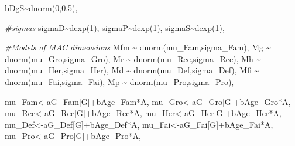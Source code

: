 \documentclass[
]{book}
\newenvironment{Shaded}{\begin{snugshade}}{\end{snugshade}}
\newcommand{\CommentTok}[1]{\textcolor[rgb]{0.56,0.35,0.01}{\textit{#1}}}
\newcommand{\DecValTok}[1]{\textcolor[rgb]{0.00,0.00,0.81}{#1}}
\newcommand{\FloatTok}[1]{\textcolor[rgb]{0.00,0.00,0.81}{#1}}
\newcommand{\FunctionTok}[1]{\textcolor[rgb]{0.00,0.00,0.00}{#1}}
\newcommand{\NormalTok}[1]{#1}
\newcommand{\OtherTok}[1]{\textcolor[rgb]{0.56,0.35,0.01}{#1}}
\newcommand{\SpecialCharTok}[1]{\textcolor[rgb]{0.00,0.00,0.00}{#1}}
\begin{document}
\begin{Shaded}
\begin{Highlighting}[]
\NormalTok{    bDgS}\SpecialCharTok{\textasciitilde{}}\FunctionTok{dnorm}\NormalTok{(}\DecValTok{0}\NormalTok{,}\FloatTok{0.5}\NormalTok{),}
    
    \CommentTok{\#sigmas}
\NormalTok{    sigmaD}\SpecialCharTok{\textasciitilde{}}\FunctionTok{dexp}\NormalTok{(}\DecValTok{1}\NormalTok{),}
\NormalTok{    sigmaP}\SpecialCharTok{\textasciitilde{}}\FunctionTok{dexp}\NormalTok{(}\DecValTok{1}\NormalTok{),}
\NormalTok{    sigmaS}\SpecialCharTok{\textasciitilde{}}\FunctionTok{dexp}\NormalTok{(}\DecValTok{1}\NormalTok{),}
    
    \CommentTok{\#Models of MAC dimensions}
\NormalTok{    Mfm }\SpecialCharTok{\textasciitilde{}} \FunctionTok{dnorm}\NormalTok{(mu\_Fam,sigma\_Fam),}
\NormalTok{    Mg }\SpecialCharTok{\textasciitilde{}} \FunctionTok{dnorm}\NormalTok{(mu\_Gro,sigma\_Gro),}
\NormalTok{    Mr }\SpecialCharTok{\textasciitilde{}} \FunctionTok{dnorm}\NormalTok{(mu\_Rec,sigma\_Rec),}
\NormalTok{    Mh }\SpecialCharTok{\textasciitilde{}} \FunctionTok{dnorm}\NormalTok{(mu\_Her,sigma\_Her),}
\NormalTok{    Md }\SpecialCharTok{\textasciitilde{}} \FunctionTok{dnorm}\NormalTok{(mu\_Def,sigma\_Def),}
\NormalTok{    Mfi }\SpecialCharTok{\textasciitilde{}} \FunctionTok{dnorm}\NormalTok{(mu\_Fai,sigma\_Fai),}
\NormalTok{    Mp }\SpecialCharTok{\textasciitilde{}} \FunctionTok{dnorm}\NormalTok{(mu\_Pro,sigma\_Pro),}
    
\NormalTok{    mu\_Fam}\OtherTok{\textless{}{-}}\NormalTok{aG\_Fam[G]}\SpecialCharTok{+}\NormalTok{bAge\_Fam}\SpecialCharTok{*}\NormalTok{A,}
\NormalTok{    mu\_Gro}\OtherTok{\textless{}{-}}\NormalTok{aG\_Gro[G]}\SpecialCharTok{+}\NormalTok{bAge\_Gro}\SpecialCharTok{*}\NormalTok{A,}
\NormalTok{    mu\_Rec}\OtherTok{\textless{}{-}}\NormalTok{aG\_Rec[G]}\SpecialCharTok{+}\NormalTok{bAge\_Rec}\SpecialCharTok{*}\NormalTok{A,}
\NormalTok{    mu\_Her}\OtherTok{\textless{}{-}}\NormalTok{aG\_Her[G]}\SpecialCharTok{+}\NormalTok{bAge\_Her}\SpecialCharTok{*}\NormalTok{A,}
\NormalTok{    mu\_Def}\OtherTok{\textless{}{-}}\NormalTok{aG\_Def[G]}\SpecialCharTok{+}\NormalTok{bAge\_Def}\SpecialCharTok{*}\NormalTok{A,}
\NormalTok{    mu\_Fai}\OtherTok{\textless{}{-}}\NormalTok{aG\_Fai[G]}\SpecialCharTok{+}\NormalTok{bAge\_Fai}\SpecialCharTok{*}\NormalTok{A,}
\NormalTok{    mu\_Pro}\OtherTok{\textless{}{-}}\NormalTok{aG\_Pro[G]}\SpecialCharTok{+}\NormalTok{bAge\_Pro}\SpecialCharTok{*}\NormalTok{A,}
    

\end{Highlighting}
\end{Shaded}
\end{document}
